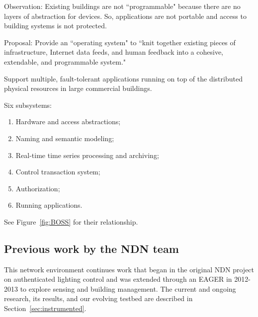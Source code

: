 Observation:  Existing buildings are not ``programmable" because there are no layers of abstraction for devices.  So, applications are not portable and access to building systems is not protected.

Proposal: Provide an ``operating system" to ``knit together existing pieces of infrastructure, Internet data feeds, and human feedback into a cohesive, extendable, and programmable system." 

Support multiple, fault-tolerant applications running on top of the distributed physical resources in large commercial buildings. 

Six subsystems:
\begin{enumerate}
\item Hardware and access abstractions;
\item Naming and semantic modeling;
\item Real-time time series processing and archiving;
\item Control transaction system;
\item Authorization;
\item Running applications.
\end{enumerate}

See Figure~\ref{fig:BOSS} for their relationship. 

\subsection{Previous work by the NDN team}

This network environment continues work that began in the original NDN project on authenticated lighting control and was extended through an EAGER in 2012-2013 to explore sensing and building management.  The current and ongoing research, its results, and our evolving testbed are described in Section~\ref{sec:instrumented}.  
